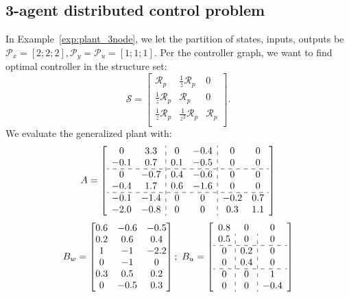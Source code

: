 \subsection{3-agent distributed control problem}
In Example~\ref{exp:plant_3node}, we let the partition of states, inputs, outputs be \(\mathcal{P}_x =[2;2;2], \mathcal{P}_y = \mathcal{P}_u =[1;1;1]\). Per the controller graph, we want to find optimal controller in the structure set:
\[
\mathcal{S}= \begin{bmatrix}
    \mathcal{R}_p & \frac{1}{z} \mathcal{R}_p & 0 \\
    \frac{1}{z} \mathcal{R}_p & \mathcal{R}_p & 0\\
    \frac{1}{z} \mathcal{R}_p & \frac{1}{z^2}\mathcal{R}_p & \mathcal{R}_p\\
\end{bmatrix}.
\]
We evaluate the generalized plant with:
\begin{equation*}
A = \left[
\begin{array}{cc:cc:cc}
0  &  3.3  & 0 &  -0.4  &  0 &  0 \\
-0.1  &  0.7  &  0.1  & -0.5 &  0 &  0 \\
\hdashline
0 & -0.7 &  0.4 & -0.6  & 0 & 0 \\
-0.4 & 1.7  & 0.6 & -1.6 & 0 & 0 \\
\hdashline
-0.1 &  -1.4  & 0  & 0  &  -0.2  &  0.7 \\
-2.0  & -0.8  & 0 & 0 & 0.3  &  1.1 \\
\end{array}
\right]
\end{equation*}
\begin{equation*}  
B_w = 
\begin{bmatrix}
0.6 & -0.6 & -0.5\\
0.2 & 0.6 & 0.4\\
1 & -1 & -2.2\\
0 & -1 & 0\\
0.3 & 0.5 & 0.2\\
0 & -0.5 & 0.3\\
\end{bmatrix};\  B_u = \left[ \begin{array}{c:c:c}
    0.8 & 0 & 0 \\
    0.5 & 0 & 0\\
    \hdashline
    0 & 0.2 & 0\\
    0 & 0.4 & 0\\
    \hdashline
    0 & 0 & 1 \\
    0 & 0 & -0.4
\end{array}
\right]
\end{equation*}

